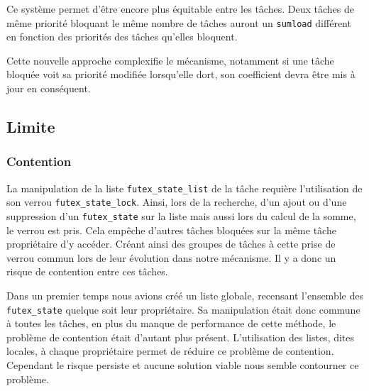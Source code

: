 Ce système permet d'être encore plus équitable entre les tâches. Deux tâches de même priorité bloquant
le même nombre de tâches auront un \verb|sumload| différent en fonction des priorités des tâches qu'elles bloquent.

Cette nouvelle approche complexifie le mécanisme, notamment si une tâche bloquée voit sa priorité modifiée
lorsqu'elle dort, son coefficient devra être mis à jour en conséquent.



\subsection{Limite}

\subsubsection{Contention}
La manipulation de la liste \verb|futex_state_list| de la tâche requière l'utilisation de son verrou
\verb|futex_state_lock|. Ainsi, lors de la recherche, d'un ajout ou d'une suppression d'un \verb|futex_state|
sur la liste mais aussi lors du calcul de la somme, le verrou est pris. Cela empêche d'autres tâches bloquées
sur la même tâche propriétaire d'y accéder. Créant ainsi des groupes de tâches à cette prise de
verrou commun lors de leur évolution dans notre mécanisme. Il y a donc un risque de contention entre ces tâches.

Dans un premier temps nous avions créé un liste globale, recensant l'ensemble des \verb|futex_state| quelque soit
leur propriétaire. Sa manipulation était donc commune à toutes les tâches, en plus du manque de performance de 
cette méthode, le problème de contention était d'autant plus présent. L'utilisation des listes, dites locales, à chaque
propriétaire permet de réduire ce problème de contention. Cependant le risque persiste et aucune solution 
viable nous semble contourner ce problème.